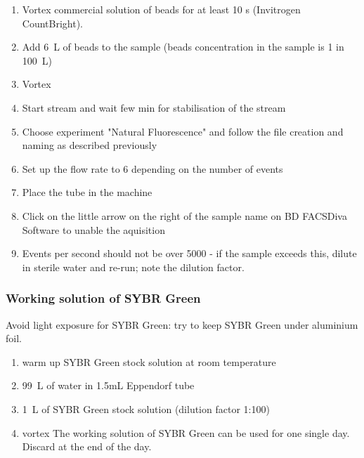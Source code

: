 \begin{enumerate}
\item Vortex commercial solution of beads for at least 10 s (Invitrogen CountBright).
\item Add 6~\textmu L of beads to the sample (beads concentration in the sample is 1 in 100~\textmu L)
\item Vortex 
\item Start stream and wait few min for stabilisation of the stream
\item Choose experiment "Natural Fluorescence" and follow the file creation and naming as described previously
\item Set up the flow rate to 6 depending on the number of events 
\item Place the tube in the machine
\item Click on the little arrow on the right of the sample name on BD FACSDiva Software to unable the aquisition
\item Events per second should not be over 5000 - if the sample exceeds this, dilute in sterile water and re-run; note the dilution factor.
\end{enumerate}

\subsubsection{Working solution of SYBR Green}
Avoid light exposure for SYBR Green: try to keep SYBR Green under aluminium foil.
\begin{enumerate}
\item warm up SYBR Green stock solution at room temperature
\item 99~\textmu L of water in 1.5mL Eppendorf tube
\item 1~\textmu L of SYBR Green stock solution (dilution factor 1:100)
\item vortex
The working solution of SYBR Green can be used for one single day. Discard at the end of the day.
\end{enumerate}




